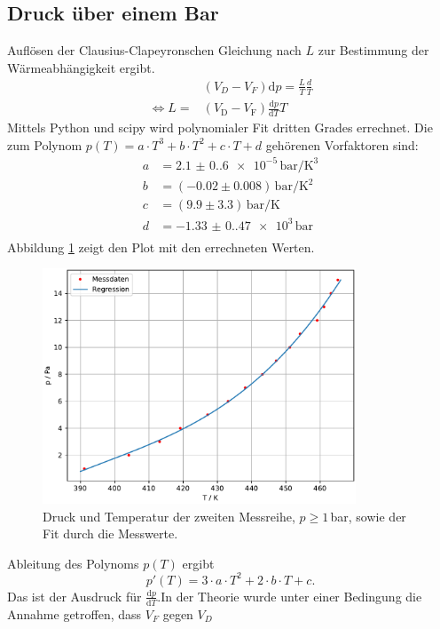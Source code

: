 \subsection{Druck über einem Bar}
Auflösen der Clausius-Clapeyronschen Gleichung nach $L$ zur Bestimmung der Wärmeabhängigkeit ergibt.\\
\begin{align}
  &(V_D-V_F)\text{d}p=\frac{L}{T}\frac{d}T\nonumber\\
  \Leftrightarrow L=&(V_\text{D}-V_\text{F})\frac{\text{d}p}{\text{d}T}T\label{eqn:L(V,T)}
\end{align}
Mittels Python und scipy wird polynomialer Fit dritten Grades errechnet. Die 
zum Polynom $p(T)=a\cdot T^3+b\cdot T^2+c\cdot T+d$ gehörenen Vorfaktoren sind:
\begin{align*}
  a &= \num{2.1(0.6)e-5}\,\si{\bar\per\kelvin\cubed}\\
  b &= (-0.02 ± 0.008)\,\si{\bar\per\kelvin\squared}\\
  c &= (9.9 ± 3.3)\,\si{\bar\per\kelvin}\\
  d &= \num{-1.33(0.47)e3}\,\si{\bar}\\
\end{align*}
Abbildung \ref{fig:Druck_groß} zeigt den Plot mit den errechneten Werten.
\begin{figure}[H]
\centering
\includegraphics[height=7cm]{plotd.pdf}
\caption{Druck und Temperatur der zweiten Messreihe, $p\geq 1$\,bar, sowie 
der Fit durch die Messwerte.}
\label{fig:Druck_groß}
\end{figure}
Ableitung des Polynoms $p(T)$ ergibt
\begin{equation}
p'(T)=3\cdot a\cdot T^2+2\cdot b\cdot T+c.
\end{equation}
Das ist der Ausdruck für $\frac{\text{d}p}{\text{d}T}$.In der Theorie wurde unter einer Bedingung die Annahme getroffen, dass $V_F$ gegen $V_D$
